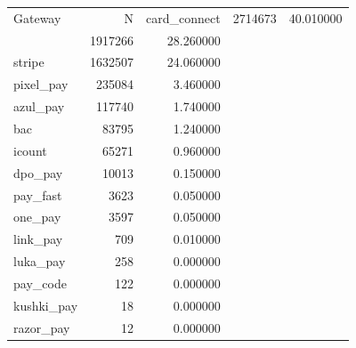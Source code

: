 \begin{tabular}{lrr}
\toprule
Gateway & N & %
\midrule
card_connect & 2714673 & 40.010000 \\
 & 1917266 & 28.260000 \\
stripe & 1632507 & 24.060000 \\
pixel_pay & 235084 & 3.460000 \\
azul_pay & 117740 & 1.740000 \\
bac & 83795 & 1.240000 \\
icount & 65271 & 0.960000 \\
dpo_pay & 10013 & 0.150000 \\
pay_fast & 3623 & 0.050000 \\
one_pay & 3597 & 0.050000 \\
link_pay & 709 & 0.010000 \\
luka_pay & 258 & 0.000000 \\
pay_code & 122 & 0.000000 \\
kushki_pay & 18 & 0.000000 \\
razor_pay & 12 & 0.000000 \\
\bottomrule
\end{tabular}
